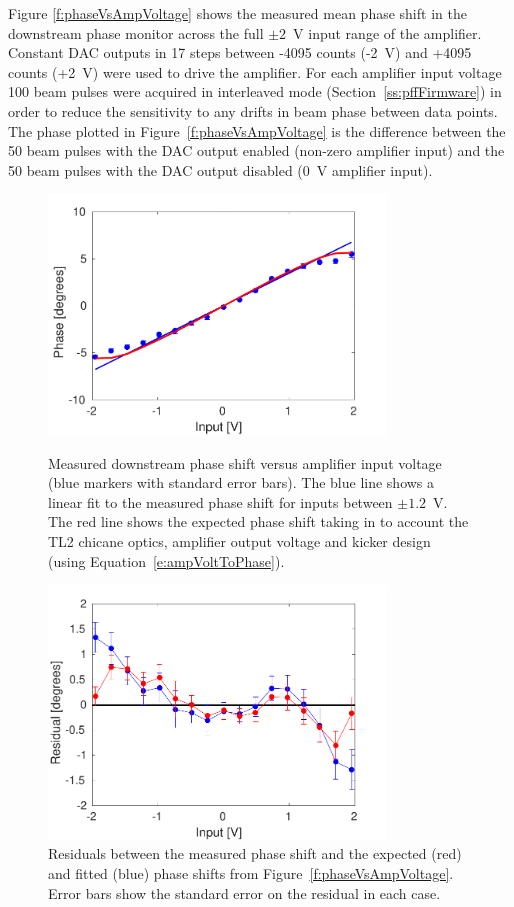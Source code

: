 Figure \ref{f:phaseVsAmpVoltage} shows the measured mean phase shift in the downstream phase monitor across the full \(\pm2\)~V input range of the amplifier. Constant DAC outputs in 17 steps between -4095 counts (-2~V) and +4095 counts (+2~V) were used to drive the amplifier. For each amplifier input voltage 100 beam pulses were acquired in interleaved mode (Section~\ref{ss:pffFirmware}) in order to reduce the sensitivity to any drifts in beam phase between data points. The phase plotted in Figure~\ref{f:phaseVsAmpVoltage} is the difference between the 50 beam pulses with the DAC output enabled (non-zero amplifier input) and the 50 beam pulses with the DAC output disabled (0~V amplifier input).

\begin{figure}
  \centering
  \includegraphics[width=0.8\textwidth]{Figures/commissioning/phaseVsAmpVoltage}
  \caption{Measured downstream phase shift versus amplifier input voltage (blue markers with standard error bars). The blue line shows a linear fit to the measured phase shift for inputs between \(\pm1.2\)~V. The red line shows the expected phase shift taking in to account the TL2 chicane optics, amplifier output voltage and kicker design (using Equation~\ref{e:ampVoltToPhase}).}
  \label{f:phaseVsAmpVoltage}
  \includegraphics[width=0.8\textwidth]{Figures/commissioning/phaseVsAmpVoltage_residuals}
  \caption{Residuals between the measured phase shift and the expected (red) and fitted (blue) phase shifts from Figure~\ref{f:phaseVsAmpVoltage}. Error bars show the standard error on the residual in each case.}
  \label{f:phaseVsAmp_resid}
\end{figure}


